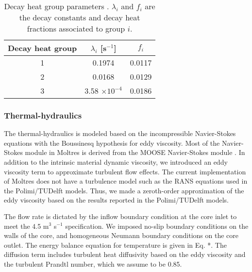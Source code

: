 \begin{table}[htb!]
	\centering
	\caption{Decay heat group parameters \cite{fiorina_modelling_2014}.
	$\lambda_i$ and $f_i$ are the decay constants and decay heat fractions
	associated to group $i$.}
	\begin{tabular}{S S S}
		\hline
		{Decay heat group} & {$\lambda_i$ [s$^{-1}$]} & {$f_i$} \\
		 & 0.1974 & 0.0117 \\
		2 & 0.0168 & 0.0129 \\
		3 & 3.58 $\times 10^{-4}$ & 0.0186 \\
		\hline
	\end{tabular}
	\label{table:decay}
\end{table}

\subsubsection{Thermal-hydraulics}

The thermal-hydraulics is modeled based on the incompressible Navier-Stokes
equations with the Boussinesq hypothesis for eddy viscosity. Most of the
Navier-Stokes module in Moltres is derived from the MOOSE Navier-Stokes module
\cite{peterson_overview_2017}. In addition to the intrinsic material dynamic
viscosity, we introduced an eddy viscosity term to approximate turbulent flow
effects. The current implementation of Moltres does not have a turbulence
model such as the \gls{RANS} equations used in the Polimi/TUDelft models.
Thus, we made a zeroth-order approximation of the eddy viscosity based on the
results reported in the Polimi/TUDelft models.

The flow rate is dictated by the inflow boundary condition at the core inlet
to meet the 4.5 m$^3$ s$^{-1}$ specification. We imposed no-slip boundary
conditions on the walls of the core, and homogeneous Neumann boundary
conditions on the core outlet. The energy balance equation for temperature is
given in Eq. *. The diffusion term includes turbulent heat diffusivity based
on the eddy viscosity and the turbulent Prandtl number, which we assume to be
0.85.
